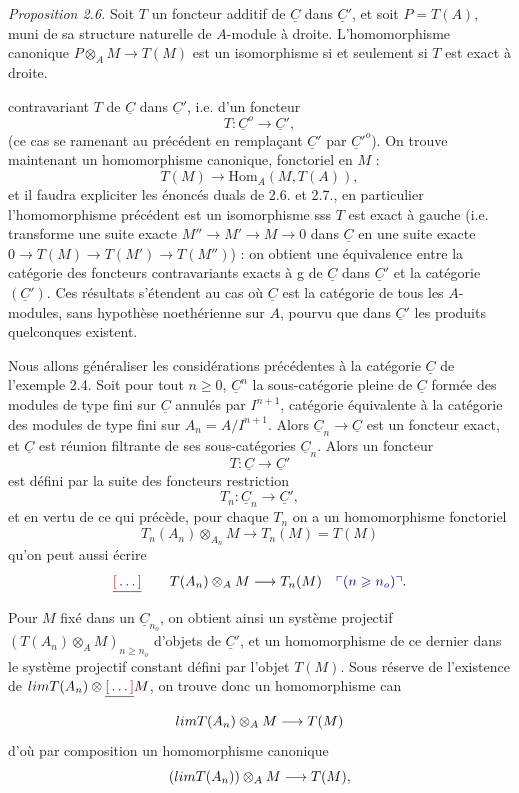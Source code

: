 \documentclass[11pt,a4paper]{article}
\begin{document}
\emph{Proposition 2.6.} Soit $T$ un foncteur additif de $\underline{C}$ dans $\underline{C}'$, et soit $P = T(A)$, muni de sa structure naturelle de $A$-module à droite. L'homomorphisme canonique $P \otimes_A M \to T(M)$ est un isomorphisme si et seulement si $T$ est exact à droite.


contravariant $T$ de $\underline{C}$ dans $\underline{C}'$, i.e. d'un foncteur
\[
  T : \underline{C}^{o} \longrightarrow \underline{C}' ,
\]
(ce cas se ramenant au précédent en remplaçant $\underline{C}'$ par $\underline{C}'^{o}$). On trouve maintenant un homomorphisme canonique, fonctoriel en $M$ :
\[
  T(M) \longrightarrow \mathrm{Hom}_A(M, T(A)) ,
\]
et il faudra expliciter les énoncés duals de 2.6. et 2.7., en particulier l'homomorphisme précédent est un isomorphisme sss $T$ est exact à gauche (i.e. transforme une suite exacte $M'' \to M' \to M \to 0$ dans $\underline{C}$ en une suite exacte $0 \to T(M) \to T(M') \to T(M'')$) : on obtient une équivalence entre la catégorie des foncteurs contravariants exacts à g de $\underline{C}$ dans $\underline{C}'$ et la catégorie $(\underline{C}')$. Ces résultats s'étendent  au cas où $\underline{C}$ est la catégorie de tous les $A$-modules, sans hypothèse noethérienne sur $A$, pourvu que dans $\underline{C}'$ les produits quelconques existent.

Nous allons généraliser les considérations précédentes à la catégorie $\underline{C}$ de l'exemple 2.4. Soit pour tout $n \geqslant 0$, $\underline{C}^{n}$ la sous-catégorie pleine de $\underline{C}$ formée des modules de type fini sur $\underline{C}$  annulés par $I^{n+1}$, catégorie équivalente à la catégorie des modules de type fini sur $A_n = A/I^{n+1}$. Alors $\underline{C}_n \to \underline{C}$ est un foncteur exact, et $\underline{C}$ est réunion filtrante de ses sous-catégories $\underline{C}_n$. Alors un foncteur 
\[
  T : \underline{C} \longrightarrow \underline{C}'
\]
est défini par la suite des foncteurs restriction
\[
  T_n : \underline{C}_n \longrightarrow \underline{C}' ,
\]
et en vertu de ce qui précède, pour chaque $T_n$ on a un homomorphisme fonctoriel
\[
  T_n(A_n) \otimes_{A_n} M \longrightarrow T_n(M) = T(M)
\]
qu'on peut aussi écrire
\[
  \struck{\ill{}} \qquad T(A_n) \otimes_A M \longrightarrow T_n(M) \quad \add{(n \geqslant n_o)} .
\]
Pour $M$ fixé dans un $\underline{C}_{n_o}$, on obtient ainsi un système projectif \struck{\ill{}} $(T(A_n) \otimes_A M)_{n \geqslant n_o}$ d'objets de $\underline{C}'$, et un homomorphisme de ce dernier dans le système projectif constant défini par \struck{\ill{}} l'objet $T(M)$. Sous réserve de l'existence de $\varprojlim T(A_n) \otimes \struck{\ill{}} M$, on trouve donc un homomorphisme can
\[
  \varprojlim T(A_n) \otimes_A M \longrightarrow T(M)
\]
d'où par composition un homomorphisme canonique
\[
  \left(\varprojlim T(A_n)\right) \otimes_A M \longrightarrow T(M) ,
\]
\end{document}
